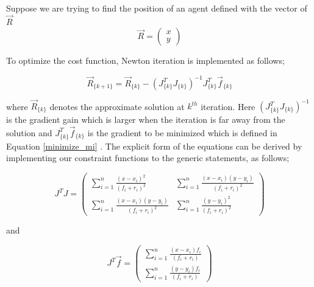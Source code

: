 	
Suppose we are trying to find the position of an agent defined with the vector of $\vec{R}$	
\begin{equation}
 \vec{R} = \left(\begin{matrix}
  x \\ y 
 \end{matrix}\right)
\end{equation}

To optimize the cost function, Newton iteration is implemented as follows;

\begin{equation}
 \vec{R}_{\{k+1\}} =  \vec{R}_{\{k\}} - (J^T_{\{k\}}J_{\{k\}})^{-1}J^T_{\{k\}}\vec{f}_{\{k\}}
\end{equation}	

where $\vec{R}_{\{k\}}$ denotes the approximate solution at $k^{th}$ iteration. Here $(J^T_{\{k\}}J_{\{k\}})^{-1}$ is the gradient gain which is larger when the iteration is far away from the solution and $J^T_{\{k\}}\vec{f}_{\{k\}}$ is the gradient to be minimized which is defined in Equation \ref{minimize_mi} \cite{22}. The explicit form of the equations can be derived  by implementing our constraint functions to the generic statements, as follows;
	
\begin{equation}
J^TJ = \left(\begin{matrix}
\sum_{i=1}^{n} \frac{(x-x_i)^2}{(f_i+r_i)^2} &  \sum_{i=1}^{n} \frac{(x-x_i)(y-y_i)}{(f_i+r_i)^2} \\
\sum_{i=1}^{n} \frac{(x-x_i)(y-y_i)}{(f_i+r_i)^2} &  \sum_{i=1}^{n} \frac{(y-y_i)^2}{(f_i+r_i)^2}
\end{matrix}\right)
\end{equation}	

and 

\begin{equation}
J^T\vec{f} = \left(\begin{matrix}
\sum_{i=1}^{n}\frac{(x-x_i)f_i}{(f_i+r_i)} \\
\sum_{i=1}^{n}\frac{(y-y_i)f_i}{(f_i+r_i)}
\end{matrix}\right)
\end{equation}
	
	
